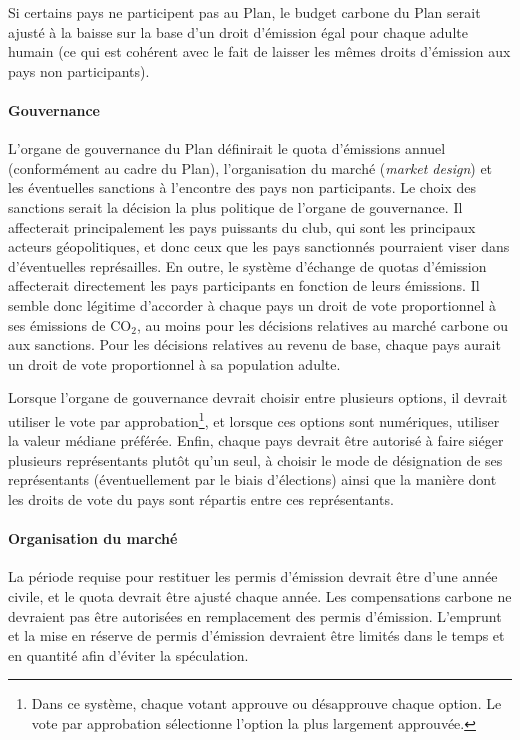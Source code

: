 \documentclass[a5paper,french]{memoir}
\begin{document}
Si certains pays ne participent pas au Plan, le budget carbone du Plan serait ajusté à la baisse sur la base d'un droit d'émission égal pour chaque adulte humain (ce qui est cohérent avec le fait de laisser les mêmes droits d'émission aux pays non participants).

\paragraph{Gouvernance} 
L'organe de gouvernance du Plan définirait le quota d'émissions annuel (conformément au cadre du Plan), l'organisation du marché (\textit{market design}) et les éventuelles sanctions à l'encontre des pays non participants. Le choix des sanctions serait la décision la plus politique de l'organe de gouvernance. Il affecterait principalement les pays puissants du club, qui sont les principaux acteurs géopolitiques, et donc ceux que les pays sanctionnés pourraient viser dans d'éventuelles représailles. En outre, le système d'échange de quotas d'émission affecterait directement les pays participants en fonction de leurs émissions. Il semble donc légitime d'accorder à chaque pays un droit de vote proportionnel à ses émissions de CO$_\text{2}$, au moins pour les décisions relatives au marché carbone ou aux sanctions. Pour les décisions relatives au revenu de base, chaque pays aurait un droit de vote proportionnel à sa population adulte. 

Lorsque l'organe de gouvernance devrait choisir entre plusieurs options, il devrait utiliser le vote par approbation\footnote{Dans ce système, chaque votant approuve ou désapprouve chaque option. Le vote par approbation sélectionne l'option la plus largement approuvée.}, et lorsque ces options sont numériques, utiliser la valeur médiane préférée. Enfin, chaque pays devrait être autorisé à faire siéger plusieurs représentants plutôt qu'un seul, à choisir le mode de désignation de ses représentants (éventuellement par le biais d'élections) ainsi que la manière dont les droits de vote du pays sont répartis entre ces représentants. 


\paragraph{Organisation du marché} 
La période requise pour restituer les permis d'émission devrait être d'une année civile, et le quota devrait être ajusté chaque année. Les compensations carbone ne devraient pas être autorisées en remplacement des permis d'émission. L'emprunt et la mise en réserve de permis d'émission devraient être limités dans le temps et en quantité afin d'éviter la spéculation. %
\end{document}
